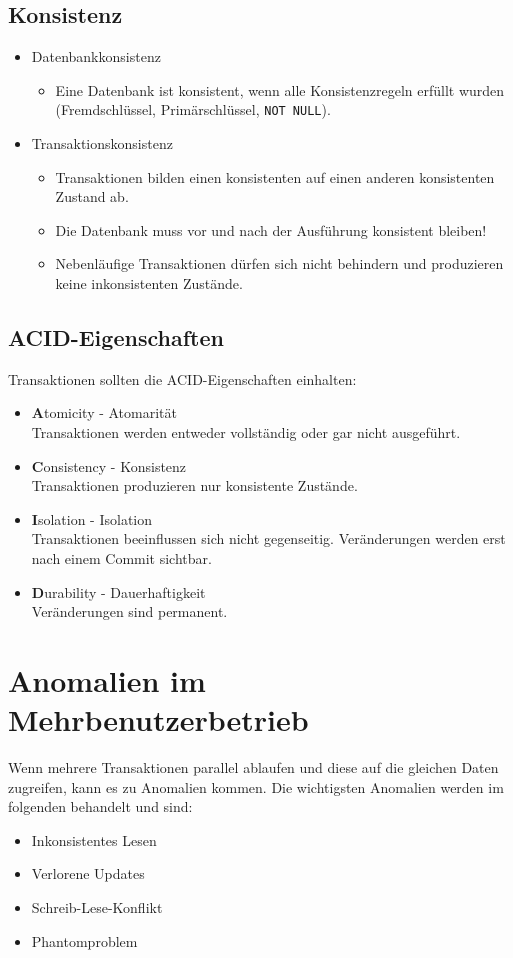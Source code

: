		\subsection{Konsistenz} %
			\begin{itemize}
				\item Datenbankkonsistenz
					\begin{itemize}
						\item Eine Datenbank ist konsistent, wenn alle Konsistenzregeln erfüllt wurden (Fremdschlüssel, Primärschlüssel, \lstinline|NOT NULL|).
					\end{itemize}
				\item Transaktionskonsistenz
					\begin{itemize}
						\item Transaktionen bilden einen konsistenten auf einen anderen konsistenten Zustand ab.
						\item Die Datenbank muss vor und nach der Ausführung konsistent bleiben!
						\item Nebenläufige Transaktionen dürfen sich nicht behindern und produzieren keine inkonsistenten Zustände.
					\end{itemize}
			\end{itemize}

		\subsection{ACID-Eigenschaften} %
			Transaktionen sollten die ACID-Eigenschaften einhalten:
			\begin{itemize}
				\item \textbf{A}tomicity - Atomarität \\ Transaktionen werden entweder vollständig oder gar nicht ausgeführt.
				\item \textbf{C}onsistency - Konsistenz \\ Transaktionen produzieren nur konsistente Zustände.
				\item \textbf{I}solation - Isolation \\ Transaktionen beeinflussen sich nicht gegenseitig. Veränderungen werden erst nach einem Commit sichtbar.
				\item \textbf{D}urability - Dauerhaftigkeit \\ Veränderungen sind permanent.
			\end{itemize}

	\section{Anomalien im Mehrbenutzerbetrieb} %
		Wenn mehrere Transaktionen parallel ablaufen und diese auf die gleichen Daten zugreifen, kann es zu Anomalien kommen. Die wichtigsten Anomalien werden im folgenden behandelt und sind:
		\begin{itemize}
			\item Inkonsistentes Lesen
			\item Verlorene Updates
			\item Schreib-Lese-Konflikt
			\item Phantomproblem
		\end{itemize}

